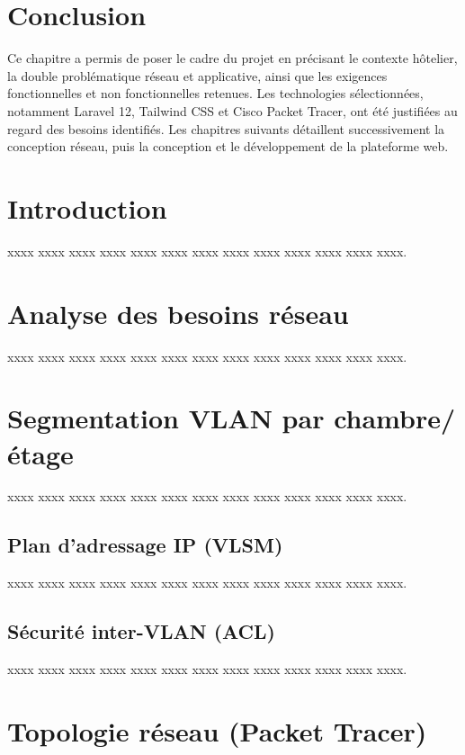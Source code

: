\documentclass[12pt,a4paper]{report}
\begin{document}
\section{Conclusion}

Ce chapitre a permis de poser le cadre du projet en précisant le contexte
hôtelier, la double problématique réseau et applicative, ainsi que les
exigences fonctionnelles et non fonctionnelles retenues. Les technologies
sélectionnées, notamment Laravel 12, Tailwind CSS et Cisco Packet Tracer,
ont été justifiées au regard des besoins identifiés. Les chapitres suivants
détaillent successivement la conception réseau, puis la conception et le
développement de la plateforme web.


\section{Introduction}

xxxx xxxx xxxx xxxx xxxx xxxx xxxx xxxx xxxx xxxx xxxx xxxx xxxx.

\section{Analyse des besoins réseau}

xxxx xxxx xxxx xxxx xxxx xxxx xxxx xxxx xxxx xxxx xxxx xxxx xxxx.

\section{Segmentation VLAN par chambre/étage}

xxxx xxxx xxxx xxxx xxxx xxxx xxxx xxxx xxxx xxxx xxxx xxxx xxxx.

\subsection{Plan d'adressage IP (VLSM)}

xxxx xxxx xxxx xxxx xxxx xxxx xxxx xxxx xxxx xxxx xxxx xxxx xxxx.

\subsection{Sécurité inter-VLAN (ACL)}

xxxx xxxx xxxx xxxx xxxx xxxx xxxx xxxx xxxx xxxx xxxx xxxx xxxx.

\section{Topologie réseau (Packet Tracer)}
\end{document}
